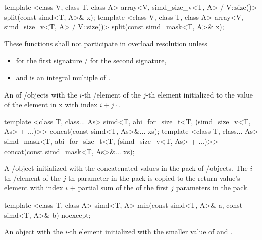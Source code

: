 \begin{itemdecl}
template <class V, class T, class A>
array<V, simd_size_v<T, A> / V::size()> split(const simd<T, A>& x);
template <class V, class T, class A>
array<V, simd_size_v<T, A> / V::size()> split(const simd_mask<T, A>& x);
\end{itemdecl}
\begin{itemdescr}
  \pnum\remarks These functions shall not participate in overload resolution unless
  \begin{itemize}
    \item {} for the first signature /  for the second signature,
    \item and  is an integral multiple of .
  \end{itemize}

  \pnum\returns An  of \simd/\mask objects with the $i$-th \simd/\mask element of the $j$-th  element initialized to the value of the element in \code x with index $i + j \cdot $.
\end{itemdescr}

\begin{itemdecl}
template <class T, class... As>
simd<T, abi_for_size_t<T, (simd_size_v<T, As> + ...)>> concat(const simd<T, As>&... xs);
template <class T, class... As>
simd_mask<T, abi_for_size_t<T, (simd_size_v<T, As> + ...)>> concat(const simd_mask<T, As>&... xs);
\end{itemdecl}
\begin{itemdescr}
  \pnum\returns A \simd/\mask object initialized with the concatenated values in the  pack of \simd/\mask objects.
  The $i$-th \simd/\mask element of the $j$-th parameter in the  pack is copied to the return value's element with index $i$ + partial sum of the  of the first $j$ parameters in the  pack.
\end{itemdescr}

\begin{itemdecl}
template <class T, class A>
simd<T, A> min(const simd<T, A>& a, const simd<T, A>& b) noexcept;
\end{itemdecl}
\begin{itemdescr}
  \pnum\returns An object with the $i$-th element initialized with the smaller value of  and  \foralli.
\end{itemdescr}


